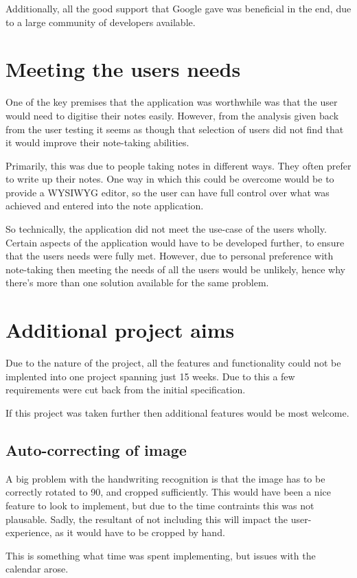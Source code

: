 Additionally, all the good support that Google gave was beneficial in the end, due to a large community of developers available.
\section{Meeting the users needs}
One of the key premises that the application was worthwhile was that the user would need to digitise their notes easily. However, from the analysis given back from the user testing it seems as though that selection of users did not find that it would improve their note-taking abilities.

Primarily, this was due to people taking notes in different ways. They often prefer to write up their notes. One way in which this could be overcome would be to provide a WYSIWYG editor, so the user can have full control over what was achieved and entered into the note application.

So technically, the application did not meet the use-case of the users wholly. Certain aspects of the application would have to be developed further, to ensure that the users needs were fully met. However, due to personal preference with note-taking then meeting the needs of all the users would be unlikely, hence why there's more than one solution available for the same problem. 

\section{Additional project aims}
Due to the nature of the project, all the features and functionality could not be implented into one project spanning just 15 weeks. Due to this a few requirements were cut back from the initial specification.

If this project was taken further then additional features would be most welcome.

\subsection{Auto-correcting of image}
A big problem with the handwriting recognition is that the image has to be correctly rotated to 90\degree, and cropped sufficiently. This would have been a nice feature to look to implement, but due to the time contraints this was not plausable. Sadly, the resultant of not including this will impact the user-experience, as it would have to be cropped by hand.

This is something what time was spent implementing, but issues with the calendar arose.

